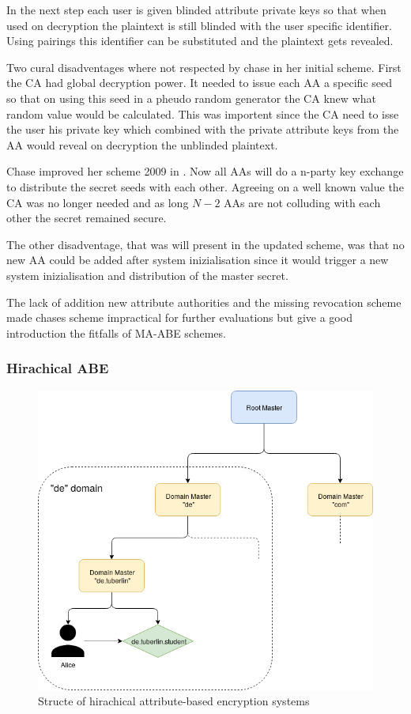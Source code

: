 In the next step each user is given blinded attribute private keys so that when used on decryption the plaintext is still blinded with the user specific identifier. Using pairings this identifier can be substituted and the plaintext gets revealed. 

Two cural disadventages where not respected by chase in her initial scheme. First the \ac{CA} had global decryption power. It needed to issue each \ac{AA} a specific seed so that on using this seed in a pheudo random generator the \ac{CA} knew what random value would be calculated. This was importent since the \ac{CA} need to isse the user his private key which combined with the private attribute keys from the \ac{AA} would reveal on decryption the unblinded plaintext. 

Chase improved her scheme 2009 in \cite{chase2009improving}. Now all \ac{AA}s will do a n-party key exchange to distribute the secret seeds with each other. Agreeing on a well known value the \ac{CA} was no longer needed and as long $N-2$ \ac{AA}s are not colluding with each other the secret remained secure. 

The other disadventage, that was will present in the updated scheme, was that no new \ac{AA} could be added after system inizialisation since it would trigger a new system inizialisation and distribution of the master secret. 

The lack of addition new attribute authorities and the missing revocation scheme made chases scheme impractical for further evaluations but give a good introduction the fitfalls of \ac{MA-ABE} schemes.

\subsubsection{Hirachical \ac{ABE}}
\label{sec:HABE}

\begin{figure}[!ht]
\centering
    \includegraphics[width=0.5\linewidth]{img/HABE.png}
    \caption{Structe of hirachical attribute-based encryption systems}
    \label{fig:habe}
\end{figure}

